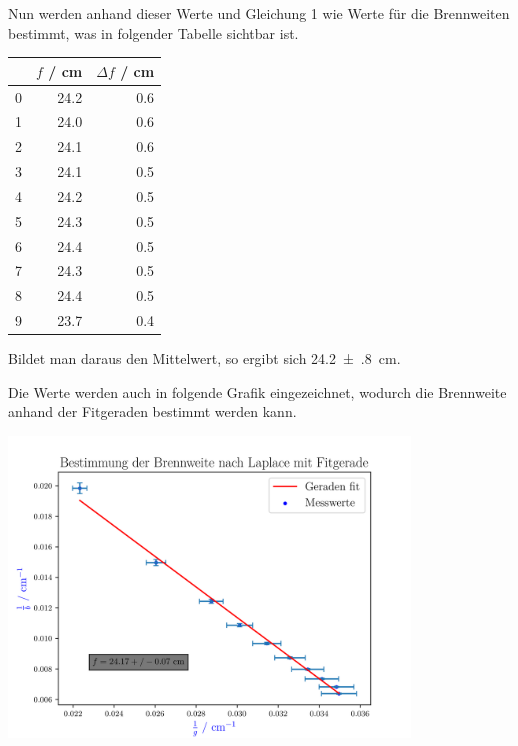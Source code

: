 \documentclass[11pt,ngerman]{scrartcl}
\begin{document}
Nun werden anhand dieser Werte und Gleichung 1 wie Werte für die Brennweiten bestimmt, was in folgender Tabelle sichtbar ist.

\begin{center}
	\begin{tabular}{lrr}
		\toprule
		{} & $f$ / cm & $\Delta f$ / cm \\
		\midrule
		0  & 24.2     & 0.6             \\
		1  & 24.0     & 0.6             \\
		2  & 24.1     & 0.6             \\
		3  & 24.1     & 0.5             \\
		4  & 24.2     & 0.5             \\
		5  & 24.3     & 0.5             \\
		6  & 24.4     & 0.5             \\
		7  & 24.3     & 0.5             \\
		8  & 24.4     & 0.5             \\
		9  & 23.7     & 0.4             \\
		\bottomrule
	\end{tabular}
\end{center}

Bildet man daraus den Mittelwert, so ergibt sich \SI{24.2(8)}{\cm}.

\newpage

Die Werte werden auch in folgende Grafik eingezeichnet, wodurch die Brennweite anhand der Fitgeraden bestimmt werden kann.

\begin{center}
	\begin{minipage}[t]{\textwidth}
		\centering
		\includegraphics[width=0.8\textwidth]{fit}
		\label{fig:fit}
	\end{minipage}
\end{center}
\end{document}
